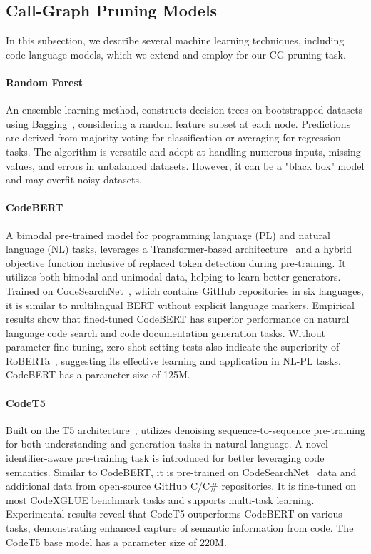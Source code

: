 \subsection{Call-Graph Pruning Models}\label{ch1:sec:models}
In this subsection, we describe several machine learning techniques, including code language models, which we extend and employ for our CG pruning task.

\paragraph{Random Forest~\cite{ho1995random}} An ensemble learning method, constructs decision trees on bootstrapped datasets using Bagging~\cite{breiman1996bagging}, considering a random feature subset at each node. Predictions are derived from majority voting for classification or averaging for regression tasks. The algorithm is versatile and adept at handling numerous inputs, missing values, and errors in unbalanced datasets. However, it can be a "black box" model and may overfit noisy datasets.

\paragraph{CodeBERT~\cite{feng2020codebert}} A bimodal pre-trained model for programming language (PL) and natural language (NL) tasks, leverages a Trans\-former-based architecture~\cite{vaswani2017attention} and a hybrid objective function inclusive of replaced token detection during pre-training. It utilizes both bimodal and unimodal data, helping to learn better generators. Trained on CodeSearchNet~\cite{husain2019codesearchnet}, which contains GitHub repositories in six languages, it is similar to multilingual BERT without explicit language markers. Empirical results show that fined-tuned CodeBERT has superior performance on natural language code search and code documentation generation tasks. Without parameter fine-tuning, zero-shot setting tests also indicate the superiority of RoBERTa~\cite{liu2019roberta}, suggesting its effective learning and application in NL-PL tasks. CodeBERT has a parameter size of 125M.

\paragraph{CodeT5~\cite{wang2021codet5}} Built on the T5 architecture~\cite{raffel2020exploring}, utilizes denoising sequence-to-sequence pre-training for both understanding and generation tasks in natural language. A novel identifier-aware pre-training task is introduced for better leveraging code semantics. Similar to CodeBERT, it is pre-trained on CodeSearchNet~\cite{husain2019codesearchnet} data and additional data from open-source GitHub  C/C\# repositories. It is fine-tuned on most CodeXGLUE benchmark tasks and supports multi-task learning. Experimental results reveal that CodeT5 outperforms CodeBERT on various tasks, demonstrating enhanced capture of semantic information from code. The CodeT5 base model has a parameter size of 220M.

